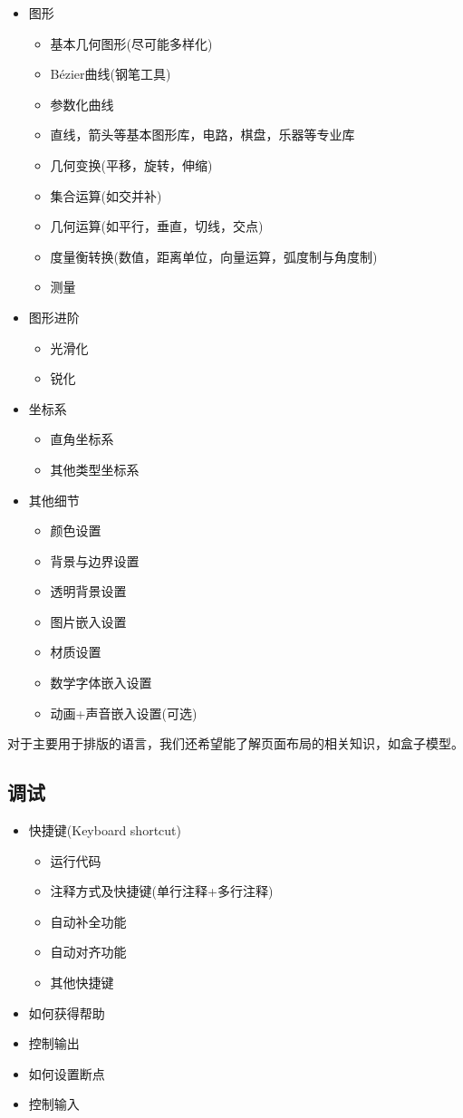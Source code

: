 \documentclass[11pt]{amsart}
\begin{document}
\begin{itemize}
\item 图形
\begin{itemize}
	\item 基本几何图形(尽可能多样化)
	\item Bézier曲线(钢笔工具)
	\item 参数化曲线
	\item 直线，箭头等基本图形库，电路，棋盘，乐器等专业库
	\item 几何变换(平移，旋转，伸缩)
	\item 集合运算(如交并补)
	\item 几何运算(如平行，垂直，切线，交点)
	\item 度量衡转换(数值，距离单位，向量运算，弧度制与角度制)
	\item 测量
\end{itemize}
\item 图形进阶
\begin{itemize}
	\item 光滑化
	\item 锐化
\end{itemize}
\item 坐标系
\begin{itemize}
	\item 直角坐标系
	\item 其他类型坐标系
\end{itemize}
\item 其他细节
\begin{itemize}
	\item 颜色设置
	\item 背景与边界设置
	\item 透明背景设置
	\item 图片嵌入设置
	\item 材质设置
	\item 数学字体嵌入设置
	\item 动画+声音嵌入设置(可选)
\end{itemize}
\end{itemize}
对于主要用于排版的语言，我们还希望能了解页面布局的相关知识，如盒子模型。
\subsection{调试}
\begin{itemize}
	\item 快捷键(Keyboard shortcut)
	\begin{itemize}
		\item 运行代码
	\item 注释方式及快捷键(单行注释+多行注释)
	\item 自动补全功能
\item 自动对齐功能
		\item 其他快捷键	
	\end{itemize}
	\item 如何获得帮助
	\item 控制输出	
	\item 如何设置断点
	\item 控制输入


\end{itemize}
\end{document}
